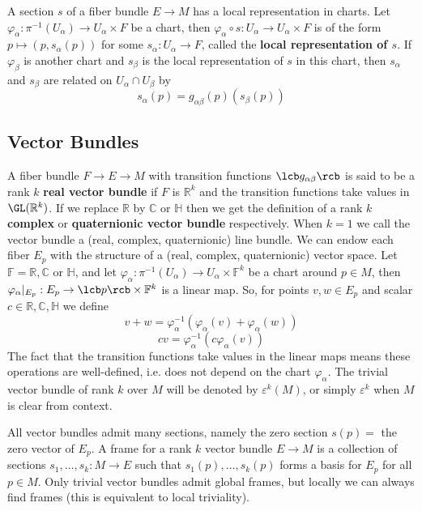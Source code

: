 A section $s$ of a fiber bundle $E \rightarrow M$ has a local representation in charts. Let $\varphi_\alpha : \pi^{-1}(U_\alpha) \rightarrow U_\alpha \times F$ be a chart, then $\varphi_\alpha \circ s : U_\alpha \rightarrow U_\alpha \times F$ is of the form $p \mapsto (p,s_\alpha(p))$ for some $s_\alpha : U_\alpha \rightarrow F$, called the \textbf{local representation of $s$}. If $\varphi_\beta$ is another chart and $s_\beta$ is the local representation of $s$ in this chart, then $s_\alpha$ and $s_\beta$ are related on $U_\alpha \cap U_\beta$ by
\begin{equation}
\label{section transformation}
s_\alpha(p) = g_{\alpha\beta}(p)(s_\beta(p))
\end{equation}


\subsection{Vector Bundles}


A fiber bundle $F \rightarrow E \rightarrow M$ with transition functions $\lcb g_{\alpha\beta} \rcb$ is said to be a rank $k$ \textbf{real vector bundle} if $F$ is $\mathbb R^k$ and the transition functions take values in $\GL(\mathbb R^k)$. If we replace $\mathbb R$ by $\mathbb C$ or $\mathbb H$ then we get the definition of a rank $k$ \textbf{complex} or \textbf{quaternionic vector bundle} respectively. When $k=1$ we call the vector bundle a (real, complex, quaternionic) line bundle. We can endow each fiber $E_p$ with the structure of a (real, complex, quaternionic) vector space. Let $\mathbb F = \mathbb R,\mathbb C$ or $\mathbb H$, and let $\varphi_\alpha : \pi^{-1}(U_\alpha) \rightarrow U_\alpha \times \mathbb F^k$ be a chart around $p \in M$, then $\varphi_\alpha|_{E_p} : E_p \rightarrow \lcb p \rcb \times \mathbb F^k$ is a linear map. So, for points $v,w \in E_p$ and scalar $c \in \mathbb R, \mathbb C, \mathbb H$ we define 
\[ v+w = \varphi_\alpha^{-1}(\varphi_\alpha(v) + \varphi_\alpha(w)) \]
\[ cv  = \varphi_\alpha^{-1}(c \varphi_\alpha(v)) \]
The fact that the transition functions take values in the linear maps means these operations are well-defined, i.e. does not depend on the chart $\varphi_\alpha$. The trivial vector bundle of rank $k$ over $M$ will be denoted by $\varepsilon^k(M)$, or simply $\varepsilon^k$ when $M$ is clear from context. 

All vector bundles admit many sections, namely the zero section $s(p) = $ the zero vector of $E_p$. A frame for a rank $k$ vector bundle $E \rightarrow M$ is a collection of sections $s_1,\ldots,s_k : M \rightarrow E$ such that $s_1(p),\ldots,s_k(p)$ forms a basis for $E_p$ for all $p \in M$. Only trivial vector bundles admit global frames, but locally  we can always find frames (this is equivalent to local triviality). 

